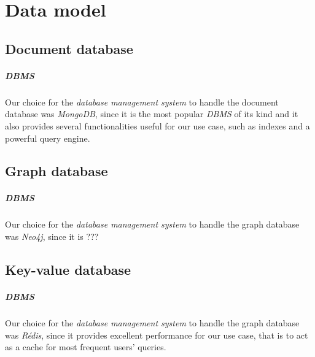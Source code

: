 \chapter{Data model}

\section{Document database}

\paragraph{DBMS} Our choice for the \textit{database management system} to 
handle the document database was \textit{MongoDB}, since it is the most popular 
\textit{DBMS} of its kind and it also provides several functionalities useful 
for our use case, such as indexes and a powerful query engine.

\section{Graph database}

\paragraph{DBMS} Our choice for the \textit{database management system} to 
handle the graph database was \textit{Neo4j}, since it is ???

\section{Key-value database}

\paragraph{DBMS} Our choice for the \textit{database management system} to 
handle the graph database was \textit{Rédis}, since it provides excellent 
performance for our use case, that is to act as a cache for most frequent 
users' queries.